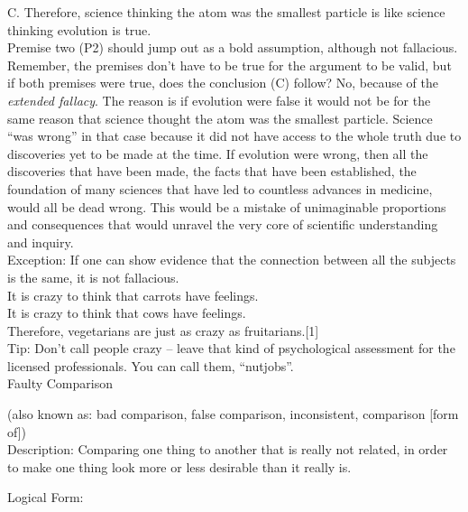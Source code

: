 \documentclass[a4paper,12pt,single,pdftex]{scrartcl}
\begin{document}
    
      C. Therefore, science thinking the atom was the smallest particle is like science thinking evolution is true.
    \\

    
      Premise two (P2) should jump out as a bold assumption, although not fallacious.  Remember, the premises don’t have to be true for the argument to be valid, but if both premises were true, does the conclusion (C) follow?  No, because of the {\it extended fallacy}.  The reason is if evolution were false it would not be for the same reason that science thought the atom was the smallest particle.  Science “was wrong” in that case because it did not have access to the whole truth due to discoveries yet to be made at the time.  If evolution were wrong, then all the discoveries that have been made, the facts that have been established, the foundation of many sciences that have led to countless advances in medicine, would all be dead wrong.  This would be a mistake of unimaginable proportions and consequences that would unravel the very core of scientific understanding and inquiry.
    \\

    
      Exception: If one can show evidence that the connection between all the subjects is the same, it is not fallacious.
    \\

    
      It is crazy to think that carrots have feelings.
    \\

    
      It is crazy to think that cows have feelings.
    \\

    
      Therefore, vegetarians are just as crazy as fruitarians.[1]
    \\

    
      Tip: Don’t call people crazy -- leave that kind of psychological assessment for the licensed professionals.  You can call them, “nutjobs”.
    \\

  

Faulty Comparison
    
      (also known as: bad comparison, false comparison, inconsistent, comparison [form of])
    \\

  
    Description: Comparing one thing to another that is really not related, in order to make one thing look more or less desirable than it really is.

    
      Logical Form:
    \\
\end{document}
